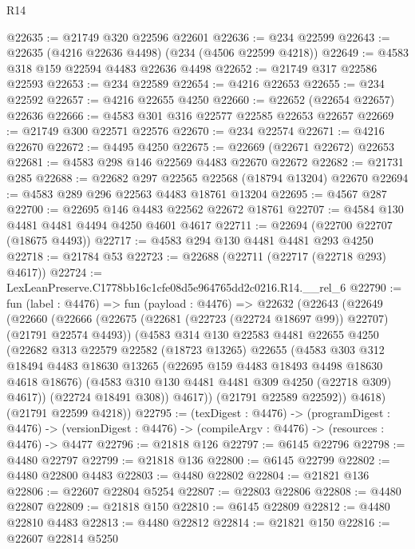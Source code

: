 \begin{lexlean}{R14}
\begin{coremodule}
@22635 := @21749 @320 @22596 @22601
@22636 := @234 @22599
@22643 := @22635 (@4216 @22636 @4498) (@234 (@4506 @22599 @4218))
@22649 := @4583 @318 @159 @22594 @4483 @22636 @4498
@22652 := @21749 @317 @22586 @22593
@22653 := @234 @22589
@22654 := @4216 @22653
@22655 := @234 @22592
@22657 := @4216 @22655 @4250
@22660 := @22652 (@22654 @22657) @22636
@22666 := @4583 @301 @316 @22577 @22585 @22653 @22657
@22669 := @21749 @300 @22571 @22576
@22670 := @234 @22574
@22671 := @4216 @22670
@22672 := @4495 @4250
@22675 := @22669 (@22671 @22672) @22653
@22681 := @4583 @298 @146 @22569 @4483 @22670 @22672
@22682 := @21731 @285
@22688 := @22682 @297 @22565 @22568 (@18794 @13204) @22670
@22694 := @4583 @289 @296 @22563 @4483 @18761 @13204
@22695 := @4567 @287
@22700 := @22695 @146 @4483 @22562 @22672 @18761
@22707 := @4584 @130 @4481 @4481 @4494 @4250 @4601 @4617
@22711 := @22694 (@22700 @22707 (@18675 @4493))
@22717 := @4583 @294 @130 @4481 @4481 @293 @4250
@22718 := @21784 @53
@22723 := @22688 (@22711 (@22717 (@22718 @293) @4617))
@22724 := LexLeanPreserve.C1778bb16c1cfe08d5e964765dd2c0216.R14.__rel_6
@22790 := fun (label : @4476) =>
  fun (payload : @4476) =>
  @22632
    (@22643
      (@22649
        (@22660
          (@22666
            (@22675 (@22681 (@22723 (@22724 @18697 @99)) @22707) (@21791 @22574 @4493))
            (@4583
              @314
              @130
              @22583
              @4481
              @22655
              @4250
              (@22682
                @313
                @22579
                @22582
                (@18723 @13265)
                @22655
                (@4583
                  @303
                  @312
                  @18494
                  @4483
                  @18630
                  @13265
                  (@22695 @159 @4483 @18493 @4498 @18630 @4618 @18676)
                  (@4583 @310 @130 @4481 @4481 @309 @4250 (@22718 @309) @4617))
                (@22724 @18491 @308))
              @4617))
          (@21791 @22589 @22592))
        @4618)
      (@21791 @22599 @4218))
@22795 := (texDigest : @4476) ->
  (programDigest : @4476) ->
  (versionDigest : @4476) -> (compileArgv : @4476) -> (resources : @4476) -> @4477
@22796 := @21818 @126
@22797 := @6145 @22796
@22798 := @4480 @22797
@22799 := @21818 @136
@22800 := @6145 @22799
@22802 := @4480 @22800 @4483
@22803 := @4480 @22802
@22804 := @21821 @136
@22806 := @22607 @22804 @5254
@22807 := @22803 @22806
@22808 := @4480 @22807
@22809 := @21818 @150
@22810 := @6145 @22809
@22812 := @4480 @22810 @4483
@22813 := @4480 @22812
@22814 := @21821 @150
@22816 := @22607 @22814 @5250

\end{coremodule}
\end{lexlean}
